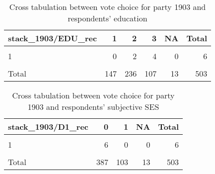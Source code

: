 \documentclass[
]{article}
\begin{document}
\begin{table}

\caption{\label{tab:unnamed-chunk-126}Cross tabulation between vote choice for party 1903 and respondents' education                   \label{table:crosstab_3_2_mt}}
\centering
\begin{tabular}[t]{l|r|r|r|r|r}
\hline
stack\_1903/EDU\_rec & 1 & 2 & 3 & NA & Total\\
\hline
\cellcolor{gray!6}{0} & \cellcolor{gray!6}{114} & \cellcolor{gray!6}{173} & \cellcolor{gray!6}{72} & \cellcolor{gray!6}{12} & \cellcolor{gray!6}{371}\\
\hline
1 & 0 & 2 & 4 & 0 & 6\\
\hline
\cellcolor{gray!6}{NA} & \cellcolor{gray!6}{33} & \cellcolor{gray!6}{61} & \cellcolor{gray!6}{31} & \cellcolor{gray!6}{1} & \cellcolor{gray!6}{126}\\
\hline
Total & 147 & 236 & 107 & 13 & 503\\
\hline
\end{tabular}
\end{table}

\begin{table}

\caption{\label{tab:unnamed-chunk-126}Cross tabulation between vote choice for party 1903 and respondents' subjective                     SES
                   \label{table:crosstab_3_3_mt}}
\centering
\begin{tabular}[t]{l|r|r|r|r}
\hline
stack\_1903/D1\_rec & 0 & 1 & NA & Total\\
\hline
\cellcolor{gray!6}{0} & \cellcolor{gray!6}{284} & \cellcolor{gray!6}{79} & \cellcolor{gray!6}{8} & \cellcolor{gray!6}{371}\\
\hline
1 & 6 & 0 & 0 & 6\\
\hline
\cellcolor{gray!6}{NA} & \cellcolor{gray!6}{97} & \cellcolor{gray!6}{24} & \cellcolor{gray!6}{5} & \cellcolor{gray!6}{126}\\
\hline
Total & 387 & 103 & 13 & 503\\
\hline
\end{tabular}
\end{table}
\end{document}
